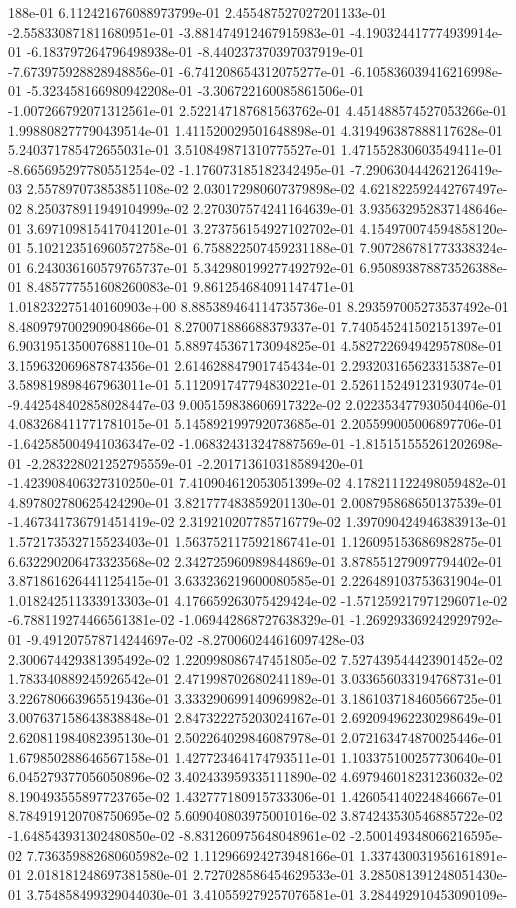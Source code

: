 188e-01	6.112421676088973799e-01	2.455487527027201133e-01	-2.558330871811680951e-01	-3.881474912467915983e-01	-4.190324417774939914e-01	-6.183797264796498938e-01	-8.440237370397037919e-01	-7.673975928828948856e-01	-6.741208654312075277e-01	-6.105836039416216998e-01	-5.323458166980942208e-01	-3.306722160085861506e-01	-1.007266792071312561e-01	2.522147187681563762e-01	4.451488574527053266e-01	1.998808277790439514e-01	1.411520029501648898e-01	4.319496387888117628e-01	5.240371785472655031e-01	3.510849871310775527e-01	1.471552830603549411e-01	-8.665695297780551254e-02	-1.176073185182342495e-01	-7.290630444262126419e-03	2.557897073853851108e-02	2.030172980607379898e-02	4.621822592442767497e-02	8.250378911949104999e-02	2.270307574241164639e-01	3.935632952837148646e-01	3.697109815417041201e-01	3.273756154927102702e-01	4.154970074594858120e-01	5.102123516960572758e-01	6.758822507459231188e-01	7.907286781773338324e-01	6.243036160579765737e-01	5.342980199277492792e-01	6.950893878873526388e-01	8.485777551608260083e-01	9.861254684091147471e-01	1.018232275140160903e+00	8.885389464114735736e-01	8.293597005273537492e-01	8.480979700290904866e-01	8.270071886688379337e-01	7.740545241502151397e-01	6.903195135007688110e-01	5.889745367173094825e-01	4.582722694942957808e-01	3.159632069687874356e-01	2.614628847901745434e-01	2.293203165623315387e-01	3.589819898467963011e-01	5.112091747794830221e-01	2.526115249123193074e-01	-9.442548402858028447e-03	9.005159838606917322e-02	2.022353477930504406e-01	4.083268411771781015e-01	5.145892199792073685e-01	2.205599005006897706e-01	-1.642585004941036347e-02	-1.068324313247887569e-01	-1.815151555261202698e-01	-2.283228021252795559e-01	-2.201713610318589420e-01	-1.423908406327310250e-01	7.410904612053051399e-02	4.178211122498059482e-01	4.897802780625424290e-01	3.821777483859201130e-01	2.008795868650137539e-01	-1.467341736791451419e-02	2.319210207785716779e-02	1.397090424946383913e-01	1.572173532715523403e-01	1.563752117592186741e-01	1.126095153686982875e-01	6.632290206473323568e-02	2.342725960989844869e-01	3.878551279097794402e-01	3.871861626441125415e-01	3.633236219600080585e-01	2.226489103753631904e-01	1.018242511333913303e-01	4.176659263075429424e-02	-1.571259217971296071e-02	-6.788119274466561381e-02	-1.069442868727638329e-01	-1.269293369242929792e-01	-9.491207578714244697e-02	-8.270060244616097428e-03	2.300674429381395492e-02	1.220998086747451805e-02	7.527439544423901452e-02	1.783340889245926542e-01	2.471998702680241189e-01	3.033656033194768731e-01	3.226780663965519436e-01	3.333290699140969982e-01	3.186103718460566725e-01	3.007637158643838848e-01	2.847322275203024167e-01	2.692094962230298649e-01	2.620811984082395130e-01	2.502264029846087978e-01	2.072163474870025446e-01	1.679850288646567158e-01	1.427723464174793511e-01	1.103375100257730640e-01	6.045279377056050896e-02	3.402433959335111890e-02	4.697946018231236032e-02	8.190493555897723765e-02	1.432777180915733306e-01	1.426054140224846667e-01	8.784919120708750695e-02	5.609040803975001016e-02	3.874243530546885722e-02	-1.648543931302480850e-02	-8.831260975648048961e-02	-2.500149348066216595e-02	7.736359882680605982e-02	1.112966924273948166e-01	1.337430031956161891e-01	2.018181248697381580e-01	2.727028586454629533e-01	3.285081391248051430e-01	3.754858499329044030e-01	3.410559279257076581e-01	3.284492910453090109e-